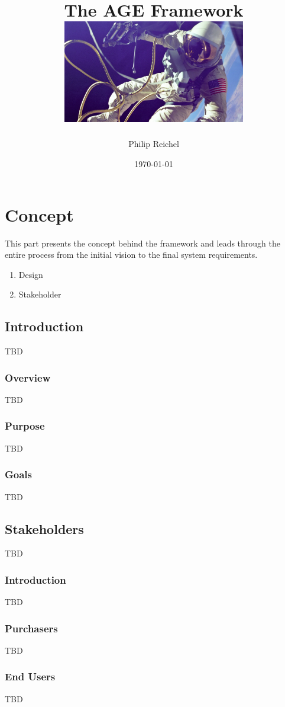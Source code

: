 \documentclass[a4paper,12pt]{book}
\title{
The AGE Framework
\linebreak
\linebreak
\includegraphics[width=8cm]{spacewalk.png}
}
\author{Philip Reichel}
\date{\today}
\begin{document}
\maketitle
\tableofcontents

\part{Concept}
This part presents the concept behind the framework and leads through the entire process from the initial vision to the final system requirements.
\begin{enumerate}
\item Design
\item Stakeholder
\end{enumerate}


\chapter{Introduction}
TBD

\section{Overview}
TBD

\section{Purpose}
TBD

\section{Goals}
TBD

\chapter{Stakeholders}
TBD

\section{Introduction}
TBD

\section{Purchasers}
TBD

\section{End Users}
TBD
\end{document}
